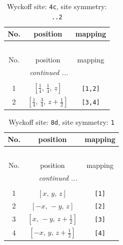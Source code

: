 \documentclass[fleqn,8pt]{jsarticle}
\begin{document}
\renewcommand{\arraystretch}{1.2}
\begin{longtable}{ccc}
\caption{Wyckoff site: {\tt 4c}, site symmetry: {\tt ..2}}
 \\
 \hline \hline
No. & position & mapping \\ \hline \endfirsthead

\multicolumn{2}{l}{\tablename\ \thetable{}} \\
 \hline \hline
No. & position & mapping \\ \hline \endhead

 \hline \hline
\multicolumn{2}{r}{\footnotesize\it continued ...} \\ \endfoot

 \hline \hline
\multicolumn{2}{r}{} \\ \endlastfoot

1 & $\left[ \frac{1}{4},\, \frac{1}{4},\, z \right]$ & {\tt [1,2]} \\ \hline
2 & $\left[ \frac{1}{4},\, \frac{3}{4},\, z + \frac{1}{2} \right]$ & {\tt [3,4]} \\
\end{longtable}
\renewcommand{\arraystretch}{1.2}
\begin{longtable}{ccc}
\caption{Wyckoff site: {\tt 8d}, site symmetry: {\tt 1}}
 \\
 \hline \hline
No. & position & mapping \\ \hline \endfirsthead

\multicolumn{2}{l}{\tablename\ \thetable{}} \\
 \hline \hline
No. & position & mapping \\ \hline \endhead

 \hline \hline
\multicolumn{2}{r}{\footnotesize\it continued ...} \\ \endfoot

 \hline \hline
\multicolumn{2}{r}{} \\ \endlastfoot

1 & $\left[ x,\, y,\, z \right]$ & {\tt [1]} \\ \hline
2 & $\left[ - x,\, - y,\, z \right]$ & {\tt [2]} \\ \hline
3 & $\left[ x,\, - y,\, z + \frac{1}{2} \right]$ & {\tt [3]} \\ \hline
4 & $\left[ - x,\, y,\, z + \frac{1}{2} \right]$ & {\tt [4]} \\
\end{longtable}
\end{document}
